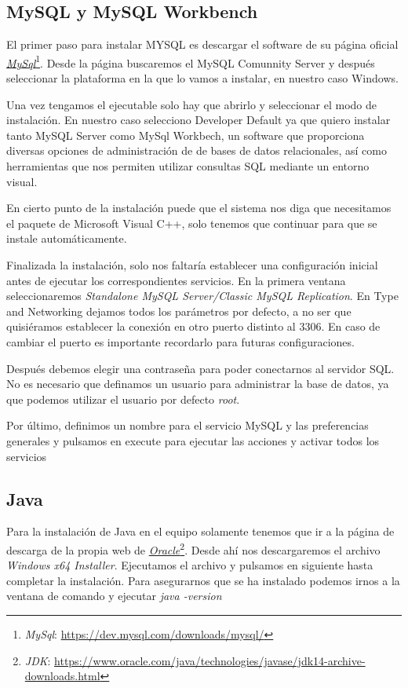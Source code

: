 \subsection{MySQL y MySQL Workbench}

El primer paso para instalar MYSQL es descargar el software de su página oficial \href{https://dev.mysql.com/downloads/mysql/}{\textit{MySql}}\footnote{\textit{MySql}: \url{https://dev.mysql.com/downloads/mysql/}}. Desde la página buscaremos el MySQL Comunnity Server y después seleccionar la plataforma en la que lo vamos a instalar, en nuestro caso Windows.

Una vez tengamos el ejecutable solo hay que abrirlo y seleccionar el modo de instalación. En nuestro caso selecciono Developer Default ya que quiero instalar tanto MySQL Server como MySql Workbech, un software que proporciona diversas opciones de administración de de bases de datos relacionales, así como herramientas que nos permiten utilizar consultas SQL mediante un entorno visual.

En cierto punto de la instalación puede que el sistema nos diga que necesitamos el paquete de Microsoft Visual C++, solo tenemos que continuar para que se instale automáticamente.

Finalizada la instalación, solo nos faltaría establecer una configuración inicial antes de ejecutar los correspondientes servicios. En la primera ventana seleccionaremos \textit{Standalone MySQL Server/Classic MySQL Replication}. En Type and Networking dejamos todos los parámetros por defecto, a no ser que quisiéramos establecer la conexión en otro puerto distinto al 3306. En caso de cambiar el puerto es importante recordarlo para futuras configuraciones.

Después debemos elegir una contraseña para poder conectarnos al servidor SQL. No es necesario que definamos un usuario para administrar la base de datos, ya que podemos utilizar el usuario por defecto \textit{root}.

Por último, definimos un nombre para el servicio MySQL y las preferencias generales y pulsamos en execute para ejecutar las acciones y activar todos los servicios

\subsection{Java}

Para la instalación de Java en el equipo solamente tenemos que ir a la página de descarga de la propia web de \href{https://www.oracle.com/java/technologies/javase/jdk14-archive-downloads.html}{\textit{Oracle}}\footnote{\textit{JDK}: \url{https://www.oracle.com/java/technologies/javase/jdk14-archive-downloads.html}}. Desde ahí nos descargaremos el archivo \textit{Windows x64 Installer}. Ejecutamos el archivo y pulsamos en siguiente hasta completar la instalación. Para asegurarnos que se ha instalado podemos irnos a la ventana de comando y ejecutar \textit{java -version}

